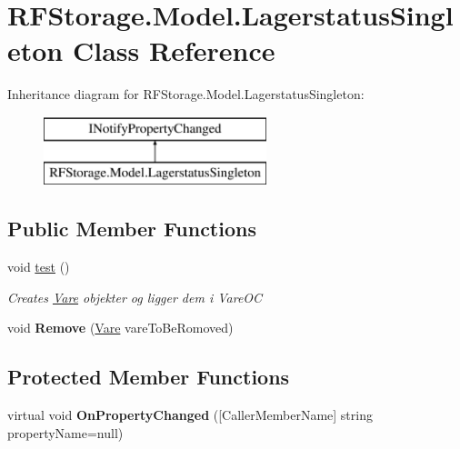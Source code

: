 \hypertarget{class_r_f_storage_1_1_model_1_1_lagerstatus_singleton}{}\section{R\+F\+Storage.\+Model.\+Lagerstatus\+Singleton Class Reference}
\label{class_r_f_storage_1_1_model_1_1_lagerstatus_singleton}
Inheritance diagram for R\+F\+Storage.\+Model.\+Lagerstatus\+Singleton\+:\begin{figure}[H]
\begin{center}
\leavevmode
\includegraphics[height=2.000000cm]{class_r_f_storage_1_1_model_1_1_lagerstatus_singleton}
\end{center}
\end{figure}
\subsection*{Public Member Functions}
\begin{DoxyCompactItemize}
\item 
void \mbox{\hyperlink{class_r_f_storage_1_1_model_1_1_lagerstatus_singleton_a81e8d9c0d1e8504bf74378959be79011}{test}} ()
\begin{DoxyCompactList}\small\item\em Creates \mbox{\hyperlink{class_r_f_storage_1_1_model_1_1_vare}{Vare}} objekter og ligger dem i Vare\+OC \end{DoxyCompactList}\item 
\mbox{\label{class_r_f_storage_1_1_model_1_1_lagerstatus_singleton_a9fcb6042865467f4d8048f4c065e0da4}} 
void {\bfseries Remove} (\mbox{\hyperlink{class_r_f_storage_1_1_model_1_1_vare}{Vare}} vare\+To\+Be\+Romoved)
\end{DoxyCompactItemize}
\subsection*{Protected Member Functions}
\begin{DoxyCompactItemize}
\item 
\mbox{\label{class_r_f_storage_1_1_model_1_1_lagerstatus_singleton_aaeb05e79c5355604861ee2aa0c6e52a3}} 
virtual void {\bfseries On\+Property\+Changed} (\mbox{[}Caller\+Member\+Name\mbox{]} string property\+Name=null)
\end{DoxyCompactItemize}
